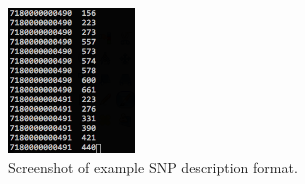 \documentclass[11pt]{llncs}
\begin{document}
\begin{figure}[!h]
\centering
   \includegraphics[width=0.3\textwidth]{graphics/Example_snp}
   \caption{Screenshot of example SNP description format.}
   \label{exampleSAM}
\end{figure}




\end{document}
